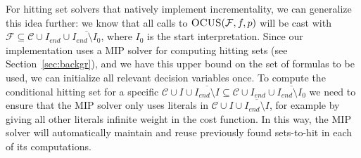 \documentclass[twoside,11pt]{article}
\newcommand\m[1]{\mathcal{#1}}
\newcommand\comment[1]{\marginpar{\tiny #1}}
\renewcommand\comment[1]{#1}
\newcommand{\emilio}[1]{{\comment{\color{red}Emilio: #1}}}
\newcommand{\bart}[1]{{\comment{\color{green}Bart: #1}}}
\newcommand\Iend{\ensuremath{I_\mathit{end} }\xspace}
\newcommand\formula{\ensuremath{\m{F} }\xspace}
\newcommand\formulac{\ensuremath{\m{C} }\xspace}
\newcommand\mm[1]{\ensuremath{#1}\xspace}
\newcommand\call[1]{\mm{\textsc{#1}}}
\newcommand\sat{\texttt{{SAT}}\xspace}
\newcommand\omus{\mm{\call{OUS}}}
\newcommand\comus{\mm{\call{OCUS}}}
\begin{document}
For hitting set solvers that natively implement incrementality, we can generalize this idea further: we know that all calls to $\comus(\formula,f,p)$ will be cast with $\formula \subseteq \m{C}\cup \Iend \cup \overline{\Iend \setminus I_0}$, where $I_0$ is the start interpretation. Since our implementation uses a MIP solver for computing hitting sets (see Section~\ref{sec:backgr}), and we have this upper bound on the set of formulas to be used, we can initialize all relevant decision variables once. To compute the conditional hitting set for a specific $\formulac\cup I\cup \overline{\Iend\setminus I} \subseteq \m{C}\cup \Iend \cup \overline{\Iend \setminus I_0}$ we need to ensure that the MIP solver only uses literals in $\formulac\cup I\cup \overline{\Iend\setminus I}$, for example by giving all other literals infinite weight in the cost function. In this way, the MIP solver will automatically maintain and reuse previously found sets-to-hit in each of its computations. 
\end{document}

